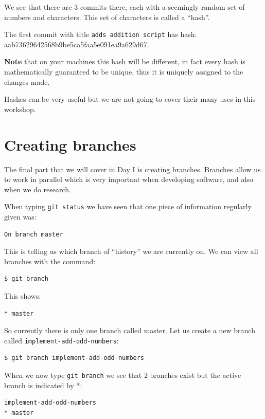 \documentclass[11pt]{article}
\begin{document}
We see that there are 3 commits there, each with a seemingly random set
of numbers and characters. This set of characters is called a ``hash''.

The first commit with title \texttt{adds\ addition\ script} has hash:
aab73629642568b9be5ca5faa5e091ea9a629d67.

\textbf{Note} that on your machines this hash will be different, in fact
every hash is mathematically guaranteed to be unique, thus it is
uniquely assigned to the changes made.

Hashes can be very useful but we are not going to cover their many uses
in this workshop.

    \hypertarget{creating-branches}{%
\section{Creating branches}\label{creating-branches}}

The final part that we will cover in Day I is creating branches.
Branches allow us to work in parallel which is very important when
developing software, and also when we do research.

    When typing \texttt{git\ status} we have seen that one piece of
information regularly given was:

\begin{verbatim}
On branch master
\end{verbatim}

This is telling us which branch of ``history'' we are currently on. We
can view all branches with the command:

\begin{verbatim}
$ git branch
\end{verbatim}

This shows:

\begin{verbatim}
* master
\end{verbatim}

So currently there is only one branch called master. Let us create a new
branch called \texttt{implement-add-odd-numbers}:

\begin{verbatim}
$ git branch implement-add-odd-numbers
\end{verbatim}

When we now type \texttt{git\ branch} we see that 2 branches exist but
the active branch is indicated by *:

\begin{verbatim}
implement-add-odd-numbers
* master
\end{verbatim}
\end{document}
